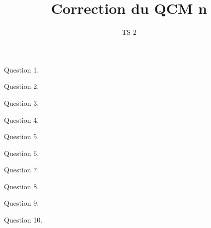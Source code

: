 \documentclass[%
french,onlymath]{beamer}
\title{Correction du QCM n\degres 1}
\author{TS 2}\institute{\texttt{[image: Logo\_augustin\_thierry]}}
\date{}
\begin{document}



\begin{frame}
 \titlepage
\end{frame}
\begin{frame}{Question 1.}


\end{frame}
\begin{frame}{Question 2.}


\end{frame}
\begin{frame}{Question 3.}


\end{frame}
\begin{frame}{Question 4.}


\end{frame}
\begin{frame}{Question 5.}


\end{frame}
\begin{frame}{Question 6.}


\end{frame}
\begin{frame}{Question 7.}


\end{frame}
\begin{frame}{Question 8.}


\end{frame}
\begin{frame}{Question 9.}


\end{frame}
\begin{frame}{Question 10.}


\end{frame}


\end{document}
